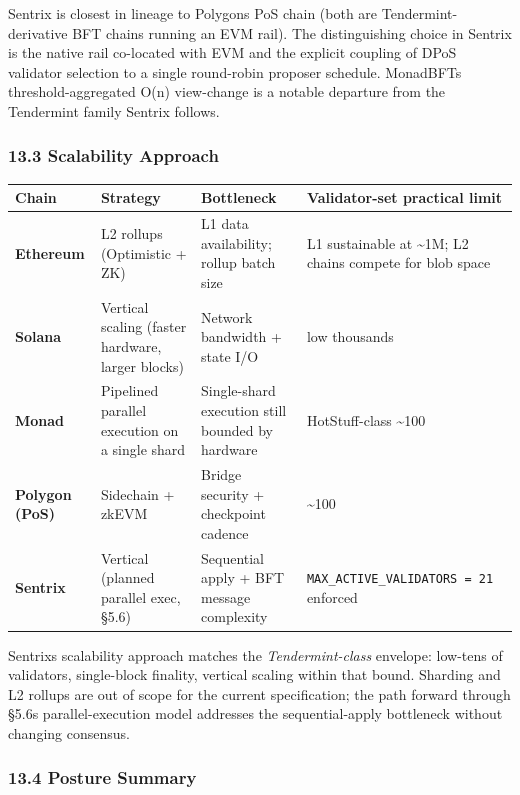 \documentclass[11pt,a4paper]{article}
\begin{document}
Sentrix is closest in lineage to Polygon\textquotesingle s PoS chain
(both are Tendermint-derivative BFT chains running an EVM rail). The
distinguishing choice in Sentrix is the native rail co-located with EVM
and the explicit coupling of DPoS validator selection to a single
round-robin proposer schedule. MonadBFT\textquotesingle s
threshold-aggregated O(n) view-change is a notable departure from the
Tendermint family Sentrix follows.

\hypertarget{133-scalability-approach}{%
\subsubsection{13.3 Scalability
Approach}\label{133-scalability-approach}}

\begin{longtable}[]{@{}llll@{}}
\toprule\noalign{}
Chain & Strategy & Bottleneck & Validator-set practical limit \\
\midrule\noalign{}
\endhead
\bottomrule\noalign{}
\endlastfoot
\textbf{Ethereum} & L2 rollups (Optimistic + ZK) & L1 data availability;
rollup batch size & L1 sustainable at \textasciitilde1M; L2 chains
compete for blob space \\
\textbf{Solana} & Vertical scaling (faster hardware, larger blocks) &
Network bandwidth + state I/O & low thousands \\
\textbf{Monad} & Pipelined parallel execution on a single shard &
Single-shard execution still bounded by hardware & HotStuff-class
\textasciitilde100 \\
\textbf{Polygon (PoS)} & Sidechain + zkEVM & Bridge security +
checkpoint cadence & \textasciitilde100 \\
\textbf{Sentrix} & Vertical (planned parallel exec, §5.6) & Sequential
apply + BFT message complexity & \texttt{MAX\_ACTIVE\_VALIDATORS\ =\ 21}
enforced \\
\end{longtable}

Sentrix\textquotesingle s scalability approach matches the
\emph{Tendermint-class} envelope: low-tens of validators, single-block
finality, vertical scaling within that bound. Sharding and L2 rollups
are out of scope for the current specification; the path forward through
§5.6\textquotesingle s parallel-execution model addresses the
sequential-apply bottleneck without changing consensus.

\hypertarget{134-posture-summary}{%
\subsubsection{13.4 Posture Summary}\label{134-posture-summary}}
\end{document}
